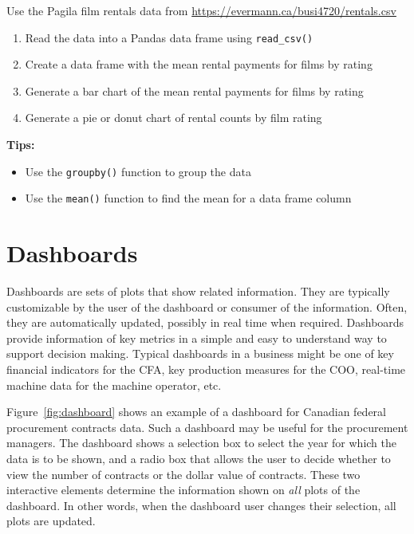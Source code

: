 \begin{exercisebox}
Use the Pagila film rentals data from \small\url{https://evermann.ca/busi4720/rentals.csv}\normalsize
\begin{enumerate}
   \item Read the data into a Pandas data frame using \texttt{read\_csv()}
   \item Create a data frame with the mean rental payments for films by rating
   \item Generate a bar chart of the mean rental payments for films by rating
   \item Generate a pie or donut chart of rental counts by film rating
\end{enumerate}

\vspace{\baselineskip}
\textbf{Tips:}
\begin{itemize}
   \item Use the \texttt{groupby()} function to group the data
   \item Use the \texttt{mean()} function to find the mean for a data frame column
\end{itemize}
\end{exercisebox}


\section{Dashboards}

Dashboards are sets of plots that show related information. They are typically customizable by the user of the dashboard or consumer of the information. Often, they are automatically updated, possibly in real time when required. Dashboards provide information of key metrics in a simple and easy to understand way to support decision making. Typical dashboards in a business might be one of key financial indicators for the CFA, key production measures for the COO, real-time machine data for the machine operator, etc. 

Figure~\ref{fig:dashboard} shows an example of a dashboard for Canadian federal procurement contracts data. Such a dashboard may be useful for the procurement managers. The dashboard shows a selection box to select the year for which the data is to be shown, and a radio box that allows the user to decide whether to view the number of contracts or the dollar value of contracts. These two interactive elements determine the information shown on \emph{all} plots of the dashboard. In other words, when the dashboard user changes their selection, all plots are updated. 

